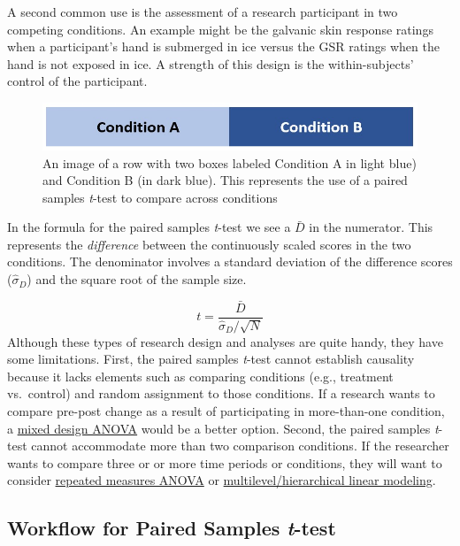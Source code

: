 \documentclass[
  11pt,
]{book}
\begin{document}
A second common use is the assessment of a research participant in two competing conditions. An example might be the galvanic skin response ratings when a participant's hand is submerged in ice versus the GSR ratings when the hand is not exposed in ice. A strength of this design is the within-subjects' control of the participant.

\begin{figure}
\centering
\includegraphics{images/ttests/conditions_paired.jpg}
\caption{An image of a row with two boxes labeled Condition A in light blue) and Condition B (in dark blue). This represents the use of a paired samples \emph{t}-test to compare across conditions}
\end{figure}

In the formula for the paired samples \emph{t}-test we see a \(\bar{D}\) in the numerator. This represents the \emph{difference} between the continuously scaled scores in the two conditions. The denominator involves a standard deviation of the difference scores (\(\hat\sigma_D\)) and the square root of the sample size.

\[t = \frac{\bar{D}}{\hat\sigma_D / \sqrt{N}}\] Although these types of research design and analyses are quite handy, they have some limitations. First, the paired samples \emph{t}-test cannot establish causality because it lacks elements such as comparing conditions (e.g., treatment vs.~control) and random assignment to those conditions. If a research wants to compare pre-post change as a result of participating in more-than-one condition, a \protect\hyperlink{Mixed}{mixed design ANOVA} would be a better option. Second, the paired samples \emph{t}-test cannot accommodate more than two comparison conditions. If the researcher wants to compare three or or more time periods or conditions, they will want to consider \protect\hyperlink{Repeated}{repeated measures ANOVA} or \href{https://lhbikos.github.io/MultilevelModeling/}{multilevel/hierarchical linear modeling}.

\hypertarget{workflow-for-paired-samples-t-test}{%
\subsection{\texorpdfstring{Workflow for Paired Samples \emph{t}-test}{Workflow for Paired Samples t-test}}\label{workflow-for-paired-samples-t-test}}
\end{document}
